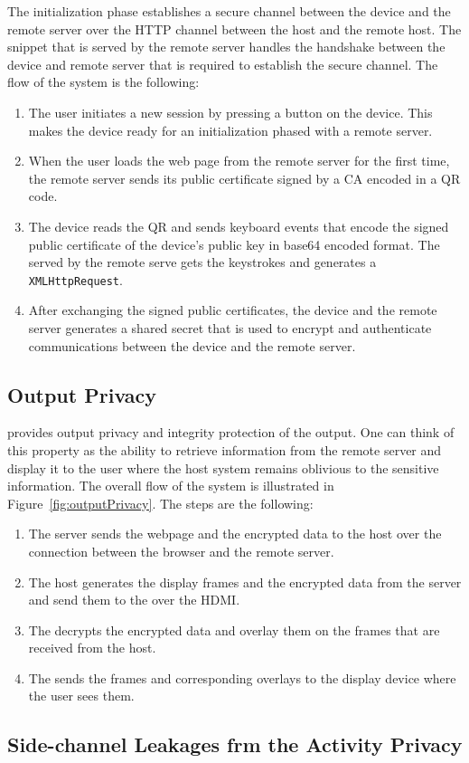  The initialization phase establishes a secure channel between the device and the remote server over the HTTP channel between the host and the remote host. The \js snippet that is served by the remote server handles the handshake between the device and remote server that is required to establish the secure channel. The flow of the system is the following: 
\begin{enumerate}
  \item The user initiates a new session by pressing a button on the device. This makes the device ready for an initialization phased with a remote server.
  \item When the user loads the web page from the remote server for the first time, the remote server sends its public certificate signed by a CA encoded in a QR code. 
  \item The device reads the QR and sends keyboard events that encode the signed public certificate of the device's public key in base64 encoded format. The \js served by the remote serve gets the keystrokes and generates a \texttt{XMLHttpRequest}.
  \item After exchanging the signed public certificates, the device and the remote server generates a shared secret that is used to encrypt and authenticate communications between the device and the remote server.
\end{enumerate}


\subsection{Output Privacy}
\label{sec:systemDesign:outputPrivacy}

\name provides output privacy and integrity protection of the output. One can think of this property as the ability to retrieve information from the remote server and display it to the user where the host system remains oblivious to the sensitive information. The overall flow of the system is illustrated in Figure~\ref{fig:outputPrivacy}. The steps are the following:

\begin{enumerate}
  \item[\one] The server sends the webpage and the encrypted data to the host over the \http connection between the browser and the remote server.
  \item[\two] The host generates the display frames and the encrypted data from the server and send them to the \device over the HDMI.
  \item[\three] The \device decrypts the encrypted data and overlay them on the frames that are received from the host.
  \item[\four] The \device sends the frames and corresponding overlays to the display device where the user sees them.
\end{enumerate}


\subsection{Side-channel Leakages frm the Activity Privacy}
\label{sec:systemDesign:sideChanneLeakage}







